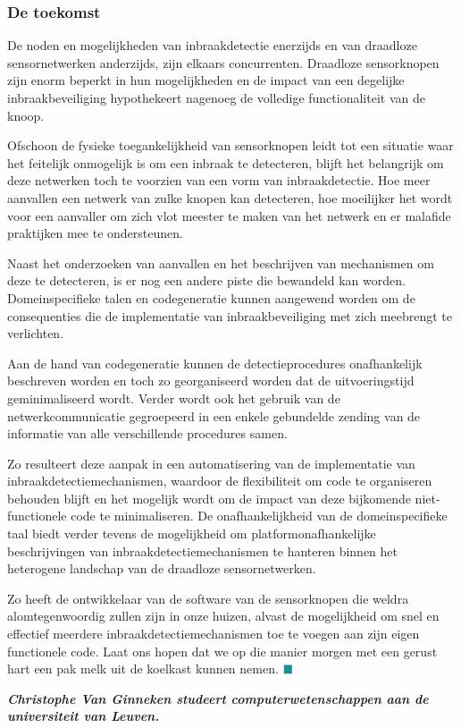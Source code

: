 \documentclass[DIV=calc,paper=a4,fontsize=11pt,twocolumn,draft]{scrartcl}
\newcommand{\heading}[1]{
\subsubsection*{#1}
\vspace{-2mm}
}
\begin{document}
\heading{De toekomst}

De noden en mogelijkheden van inbraakdetectie enerzijds en van draadloze
sensornetwerken anderzijds, zijn elkaars concurrenten. Draadloze sensorknopen
zijn enorm beperkt in hun mogelijkheden en de impact van een degelijke
inbraakbeveiliging hypothekeert nagenoeg de volledige functionaliteit van de
knoop.

Ofschoon de fysieke toegankelijkheid van sensorknopen leidt tot een situatie
waar het feitelijk onmogelijk is om een inbraak te detecteren, blijft het
belangrijk om deze netwerken toch te voorzien van een vorm van inbraakdetectie.
Hoe meer aanvallen een netwerk van zulke knopen kan detecteren, hoe moeilijker
het wordt voor een aanvaller om zich vlot meester te maken van het netwerk en
er malafide praktijken mee te ondersteunen.

Naast het onderzoeken van aanvallen en het beschrijven van mechanismen om deze
te detecteren, is er nog een andere piste die bewandeld kan worden.
Domeinspecifieke talen en codegeneratie kunnen aangewend worden om de
consequenties die de implementatie van inbraakbeveiliging met zich meebrengt te
verlichten.

Aan de hand van codegeneratie kunnen de detectieprocedures onafhankelijk
beschreven worden en toch zo georganiseerd worden dat de uitvoeringstijd
geminimaliseerd wordt. Verder wordt ook het gebruik van de netwerkcommunicatie
gegroepeerd in een enkele gebundelde zending van de informatie van alle
verschillende procedures samen.

Zo resulteert deze aanpak in een automatisering van de implementatie van
inbraakdetectiemechanismen, waardoor de flexibiliteit om code te organiseren
behouden blijft en het mogelijk wordt om de impact van deze bijkomende
niet-functionele code te minimaliseren. De onafhankelijkheid van de
domeinspecifieke taal biedt verder tevens de mogelijkheid om
platformonafhankelijke beschrijvingen van inbraakdetectiemechanismen te hanteren
binnen het heterogene landschap van de draadloze sensornetwerken.

Zo heeft de ontwikkelaar van de software van de sensorknopen die weldra
alomtegenwoordig zullen zijn in onze huizen, alvast de mogelijkheid om snel en
effectief meerdere inbraakdetectiemechanismen toe te voegen aan zijn eigen
functionele code. Laat ons hopen dat we op die manier morgen met een gerust
hart een pak melk uit de koelkast kunnen nemen. $\color{BaseColor}\blacksquare$

\vspace{0.3cm}

\bf{\emph{Christophe Van Ginneken studeert computerwetenschappen aan de
universiteit van Leuven.}}
\end{document}

